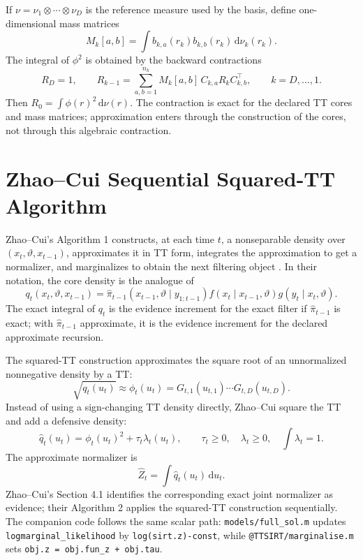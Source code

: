 \documentclass[11pt]{article}
\newcommand{\dd}{\mathrm{d}}
\theoremstyle{definition}
\theoremstyle{remark}
\begin{document}
If \(\nu=\nu_1\otimes\cdots\otimes\nu_D\) is the reference measure used by the
basis, define one-dimensional mass matrices
\[
  M_k[a,b]
  =
  \int b_{k,a}(r_k)b_{k,b}(r_k)\,\dd\nu_k(r_k).
  \label{eq:p12-mass-matrix}
\]
The integral of \(\phi^2\) is obtained by the backward contractions
\[
  R_D=1,\qquad
  R_{k-1}
  =
  \sum_{a,b=1}^{n_k}
  M_k[a,b]\,C_{k,a}R_kC_{k,b}^\top,
  \qquad k=D,\ldots,1.
  \label{eq:p12-mass-contraction}
\]
Then \(R_0=\int \phi(r)^2\,\dd\nu(r)\).  The contraction is exact for the
declared TT cores and mass matrices; approximation enters through the
construction of the cores, not through this algebraic contraction.

\section{Zhao--Cui Sequential Squared-TT Algorithm}

Zhao--Cui's Algorithm 1 constructs, at each time \(t\), a nonseparable density
over \((x_t,\vartheta,x_{t-1})\), approximates it in TT form, integrates the
approximation to get a normalizer, and marginalizes to obtain the next
filtering object \cite{zhao-cui-2024}.  In their notation, the core density is
the analogue of
\[
  q_t(x_t,\vartheta,x_{t-1})
  =
  \widehat\pi_{t-1}(x_{t-1},\vartheta\mid y_{1:t-1})
  f(x_t\mid x_{t-1},\vartheta)
  g(y_t\mid x_t,\vartheta).
  \label{eq:p12-zc-q}
\]
The exact integral of \(q_t\) is the evidence increment for the exact filter if
\(\widehat\pi_{t-1}\) is exact; with \(\widehat\pi_{t-1}\) approximate, it is
the evidence increment for the declared approximate recursion.

The squared-TT construction approximates the square root of an unnormalized
nonnegative density by a TT:
\[
  \sqrt{q_t(u_t)}
  \approx
  \phi_t(u_t)
  =
  G_{t,1}(u_{t,1})\cdots G_{t,D}(u_{t,D}).
\]
Instead of using a sign-changing TT density directly, Zhao--Cui square the TT
and add a defensive density:
\[
  \widehat q_t(u_t)
  =
  \phi_t(u_t)^2+\tau_t\lambda_t(u_t),
  \qquad
  \tau_t\ge0,\quad
  \lambda_t\ge0,\quad
  \int\lambda_t=1.
  \label{eq:p12-squared-tt-density}
\]
The approximate normalizer is
\[
  \widehat Z_t
  =
  \int \widehat q_t(u_t)\,\dd u_t.
  \label{eq:p12-squared-tt-normalizer}
\]
Zhao--Cui's Section 4.1 identifies the corresponding exact joint normalizer as
evidence; their Algorithm 2 applies the squared-TT construction sequentially.
The companion code follows the same scalar path:
\texttt{models/full\_sol.m} updates
\texttt{logmarginal\_likelihood} by \texttt{log(sirt.z)-const}, while
\texttt{@TTSIRT/marginalise.m} sets
\texttt{obj.z = obj.fun\_z + obj.tau}.
\end{document}
